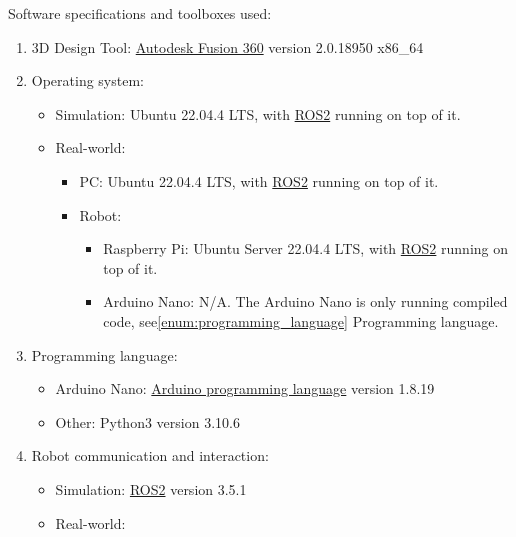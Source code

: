 Software specifications and toolboxes used:
\begin{enumerate}
    \item 3D Design Tool: \href{https://www.autodesk.com/products/fusion-360/personal}{Autodesk Fusion 360} version 2.0.18950 x86\_64
    \item Operating system:
    \begin{itemize}
        \item Simulation: Ubuntu 22.04.4 LTS, with \href{https://docs.ros.org/en/humble/index.html}{ROS2}\:\cite{macenski_impact_2023}\cite{macenski_robot_2022} running on top of it.
        \item Real-world:
        \begin{itemize}
            \item PC: Ubuntu 22.04.4 LTS, with \href{https://docs.ros.org/en/humble/index.html}{ROS2}\:\cite{macenski_impact_2023}\cite{macenski_robot_2022} running on top of it.
            \item Robot: 
            \begin{itemize}
                \item Raspberry Pi: Ubuntu Server 22.04.4 LTS, with \href{https://docs.ros.org/en/humble/index.html}{ROS2}\:\cite{macenski_impact_2023}\cite{macenski_robot_2022} running on top of it.
                \item Arduino Nano: N/A. The Arduino Nano is only running compiled code, see\:\ref{enum:programming_language} Programming language.
            \end{itemize}
        \end{itemize}
    \end{itemize}
    \item \label{enum:programming_language}Programming language:
    \begin{itemize}
        \item Arduino Nano: \href{https://www.arduino.cc/reference/en/}{Arduino programming language} version 1.8.19
        \item Other: Python3 version 3.10.6
    \end{itemize}
    \item Robot communication and interaction: 
    \begin{itemize}
        \item Simulation: \href{https://docs.ros.org/en/humble/index.html}{ROS2}\:\cite{macenski_impact_2023}\cite{macenski_robot_2022} version 3.5.1
        \item Real-world:

\end{itemize}
\end{enumerate}
